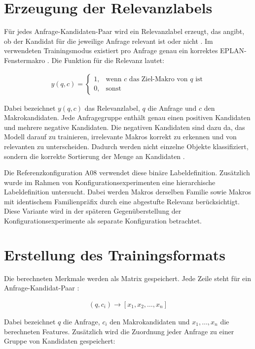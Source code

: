 \section{Erzeugung der Relevanzlabels}

Für jedes Anfrage-Kandidaten-Paar wird ein Relevanzlabel erzeugt, das angibt, ob der Kandidat für die jeweilige Anfrage relevant ist oder nicht \parencite{srcStep931}.
Im verwendeten Trainingsmodus existiert pro Anfrage genau ein korrektes EPLAN-Fenstermakro \parencite{EPLAN-Makros}. Die Funktion für die Relevanz lautet:

\begin{align}
    y(q,c) = \begin{cases} 1, & \text{wenn } c \text{ das Ziel-Makro von } q \text{ ist} \\ 0, & \text{sonst} \end{cases}
\end{align}

Dabei bezeichnet $y(q,c)$ das Relevanzlabel, $q$ die Anfrage und $c$ den Makrokandidaten. Jede Anfragegruppe enthält genau einen positiven Kandidaten und mehrere negative Kandidaten. 
Die negativen Kandidaten sind dazu da, das Modell darauf zu trainieren, irrelevante Makros korrekt zu erkennen und von relevanten zu unterscheiden. 
Dadurch werden nicht einzelne Objekte klassifiziert, sondern die korrekte Sortierung der Menge an Kandidaten \parencite{srcStep931}.

Die Referenzkonfiguration A08 verwendet diese binäre Labeldefinition. Zusätzlich wurde im Rahmen von Konfigurationsexperimenten eine hierarchische Labeldefinition untersucht. 
Dabei werden Makros derselben Familie sowie Makros mit identischem Familienpräfix durch eine abgestufte Relevanz berücksichtigt. 
Diese Variante wird in der späteren Gegenüberstellung der Konfigurationsexperimente als separate Konfiguration betrachtet.

\section{Erstellung des Trainingsformats}

Die berechneten Merkmale werden als Matrix gespeichert. Jede Zeile steht für ein Anfrage-Kandidat-Paar \parencite{srcStep931}:

\begin{align}
    (q,c_i) \rightarrow [x_1,x_2,\dots,x_n]
\end{align}

Dabei bezeichnet $q$ die Anfrage, $c_i$ den Makrokandidaten und $x_1,\dots,x_n$ die berechneten Features. Zusätzlich wird die Zuordnung jeder Anfrage zu einer Gruppe von Kandidaten gespeichert:

